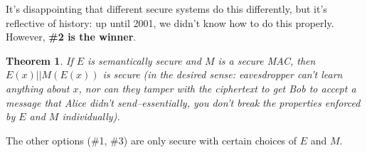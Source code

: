 \documentclass[12pt]{article}
\newtheorem{thm}{Theorem}[section]
\begin{document}
It's disappointing that different secure systems do this differently, but it's reflective of history: up until 2001, we didn't know how to do this properly. However, \textbf{\#2 is the winner}.

\begin{thm}
If $E$ is semantically secure and $M$ is a secure MAC, then $E(x) || M(E(x))$ is secure (in the desired sense: eavesdropper can't learn anything about $x$, nor can they tamper with the ciphertext to get Bob to accept a message that Alice didn't send--essentially, you don't break the properties enforced by $E$ and $M$ individually).
\end{thm}

The other options (\#1, \#3) are only secure with certain choices of $E$ and $M$.
\end{document}
